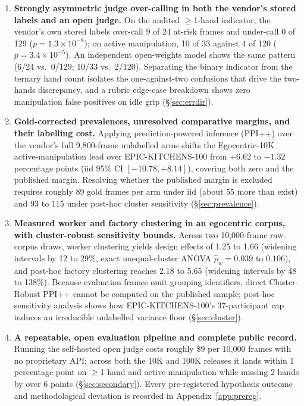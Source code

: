 \documentclass[11pt]{article}
\begin{document}
\begin{enumerate}
\item \textbf{Strongly asymmetric judge over-calling in both the vendor's stored labels and an
      open judge.} On the audited $\geq$1-hand indicator, the vendor's own stored labels over-call
      9 of 24 at-risk frames and under-call 0 of 129 ($p = 1.3\times 10^{-8}$); on active
      manipulation, 10 of 33 against 4 of 120 ($p = 3.4\times 10^{-5}$). An independent
      open-weights model shows the same pattern (6/24 vs.\ 0/129; 10/33 vs.\ 2/120). Separating
      the binary indicator from the ternary hand count isolates the one-against-two confusions
      that drive the two-hands discrepancy, and a rubric edge-case breakdown shows zero
      manipulation false positives on idle grip (\S\ref{sec:errdir}).
\item \textbf{Gold-corrected prevalences, unresolved comparative margins, and their labelling
      cost.} Applying prediction-powered inference (PPI++) \citep{angelopoulos2023ppiplusplus}
      over the vendor's full 9{,}800-frame unlabelled arms shifts the Egocentric-10K
      active-manipulation lead over EPIC-KITCHENS-100 from $+6.62$ to $-1.32$ percentage points
      (iid 95\% CI $[-10.78, +8.14]$), covering both zero and the published margin. Resolving
      whether the published margin is excluded requires roughly 89 gold frames per arm under iid
      (about 55 more than exist) and 93 to 115 under post-hoc cluster sensitivity
      (\S\ref{sec:prevalence}).
\item \textbf{Measured worker and factory clustering in an egocentric corpus, with cluster-robust
      sensitivity bounds.} Across two 10{,}000-frame raw-corpus draws, worker clustering yields
      design effects of 1.25 to 1.66 (widening intervals by 12 to 29\%, exact unequal-cluster
      ANOVA $\hat{\rho}_w = 0.039$ to $0.106$), and post-hoc factory clustering reaches 2.18 to
      5.65 (widening intervals by 48 to 138\%). Because evaluation frames omit grouping
      identifiers, direct Cluster-Robust PPI++ \citep{broska2026crppi} cannot be computed on the
      published sample; post-hoc sensitivity analysis shows how EPIC-KITCHENS-100's 37-participant
      cap induces an irreducible unlabelled variance floor (\S\ref{sec:cluster}).
\item \textbf{A repeatable, open evaluation pipeline and complete public record.} Running the
      self-hosted open judge costs roughly \$9 per 10{,}000 frames with no proprietary API; across
      both the 10K and 100K releases it lands within 1 percentage point on $\geq$1 hand and active
      manipulation while missing 2 hands by over 6 points (\S\ref{sec:secondary}). Every
      pre-registered hypothesis outcome and methodological deviation is recorded in
      Appendix~\ref{app:prereg}.
\end{enumerate}
\end{document}
